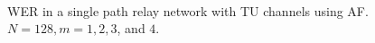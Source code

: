 \begin{figure}
{	 \\
}
\caption{WER in a single path relay network with TU channels using AF.  $N = 128, m = 1, 2, 3$, and $4$.}
\label{fig:sp_af_wer_plots_TU}
\end{figure}

